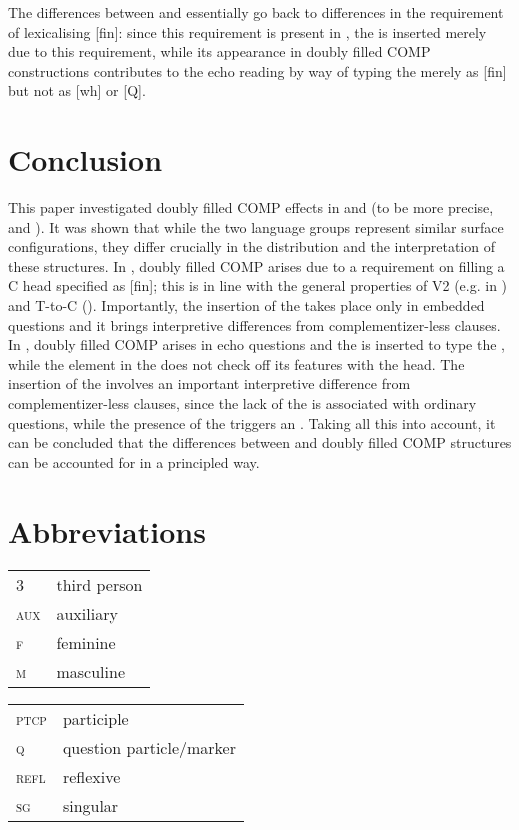 \documentclass[output=paper,modfonts, hidelinks, newtxmath]{langscibook}
\begin{document}
The differences between  and  essentially go back to differences in the requirement of lexicalising [fin]: since this requirement is present in , the  is inserted merely due to this requirement, while its appearance in  doubly filled COMP constructions contributes to the echo reading by way of typing the  merely as [fin] but not as [wh] or [Q].

\section{Conclusion}
This paper investigated doubly filled COMP effects in  and  (to be more precise,  and ). It was shown that while the two language groups represent similar surface configurations, they differ crucially in the distribution and the interpretation of these structures. In , doubly filled COMP arises due to a requirement on filling a C head specified as [fin]; this is in line with the general properties of V2 (e.g. in ) and T-to-C (). Importantly, the insertion of the  takes place only in embedded questions and it brings interpretive differences from complementizer-less clauses. In , doubly filled COMP arises in echo questions and the  is inserted to type the , while the element in the  does not check off its features with the head. The insertion of the  involves an important interpretive difference from complementizer-less clauses, since the lack of the  is associated with ordinary questions, while the presence of the  triggers an . Taking all this into account, it can be concluded that the differences between  and  doubly filled COMP structures can be accounted for in a principled way.

\section*{Abbreviations}

\begin{tabularx}{.5\textwidth}{@{}lQ@{}}
3&third person\\
\textsc{aux}&auxiliary\\
\textsc{f}&{feminine}\\
\textsc{m}&{masculine}\\
\end{tabularx}%
\begin{tabularx}{.5\textwidth}{@{}lQ@{}}
\textsc{ptcp}&{participle}\\
\textsc{q}&question particle/marker\\
\textsc{refl}&reflexive\\
\textsc{sg}&singular\\
\end{tabularx}
\end{document}
